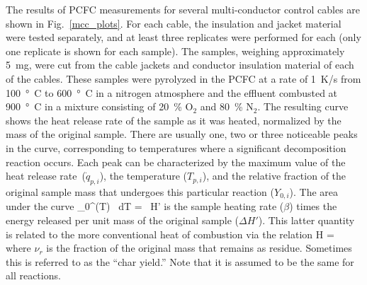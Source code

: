 \documentclass[11pt]{book}
\begin{document}
The results of PCFC measurements for several multi-conductor control cables are shown in Fig.~\ref{mcc_plots}.
For each cable, the insulation and jacket material were tested separately, and at least three replicates were performed for each
(only one replicate is shown for each sample). The samples, weighing approximately 5~mg, were cut from the cable jackets and conductor
insulation material of each of the cables. These samples were pyrolyzed in the PCFC at a rate of 1~K/s
from 100~\si{\degree C} to 600~\si{\degree C} in a nitrogen atmosphere and the effluent combusted at 900~\si{\degree C} in a mixture consisting of 20~\% O$_2$
and 80~\% N$_2$. The resulting curve shows the heat release rate of the sample as it was heated, normalized by the mass of the original sample.
There are usually one, two or three noticeable peaks in the curve, corresponding to temperatures where a significant decomposition reaction occurs.
Each peak can be characterized by the maximum value of the heat release rate~($\dot{q}_{p,i}$), the temperature ($T_{p,i}$), and the relative fraction of the original sample mass that undergoes this particular reaction ($Y_{0,i}$). The area under the curve
\be \int_0^\infty {}(T) \, dT = \beta \, \Delta H' \ee
is the sample heating rate ($\beta$) times the energy released per unit mass of the original sample ($\Delta H'$). This latter quantity is
related to the more conventional heat of combustion via the relation
\be \Delta H =  \ee
where $\nu_r$ is the fraction of the original mass that remains as residue. Sometimes this is referred to as the ``char yield.'' Note that it is
assumed to be the same for all reactions.
\end{document}
